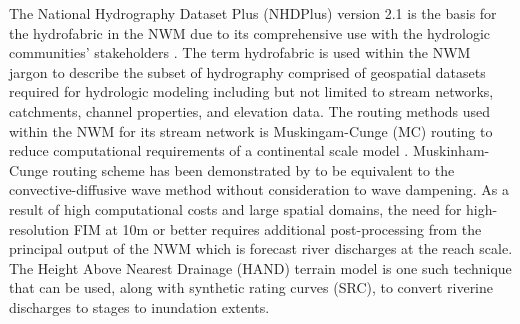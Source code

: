 The National Hydrography Dataset Plus (NHDPlus) version 2.1 is the basis for the hydrofabric in the NWM due to its comprehensive use with the hydrologic communities' stakeholders \cite{mckay2012nhdplus}. 
The term hydrofabric is used within the NWM jargon to describe the subset of hydrography comprised of geospatial datasets required for hydrologic modeling including but not limited to stream networks, catchments, channel properties, and elevation data. 
The routing methods used within the NWM for its stream network is Muskingam-Cunge (MC) routing to reduce computational requirements of a continental scale model \cite{bedient2008hydrology,ponce1994variable,gochis2018wrf}.
Muskinham-Cunge routing scheme has been demonstrated by  to be equivalent to the convective-diffusive wave method without consideration to wave dampening.
As a result of high computational costs and large spatial domains, the need for high-resolution FIM at 10m or better requires additional post-processing from the principal output of the NWM which is forecast river discharges at the reach scale. The Height Above Nearest Drainage (HAND) terrain model is one such technique that can be used, along with synthetic rating curves (SRC), to convert riverine discharges to stages to inundation extents.

